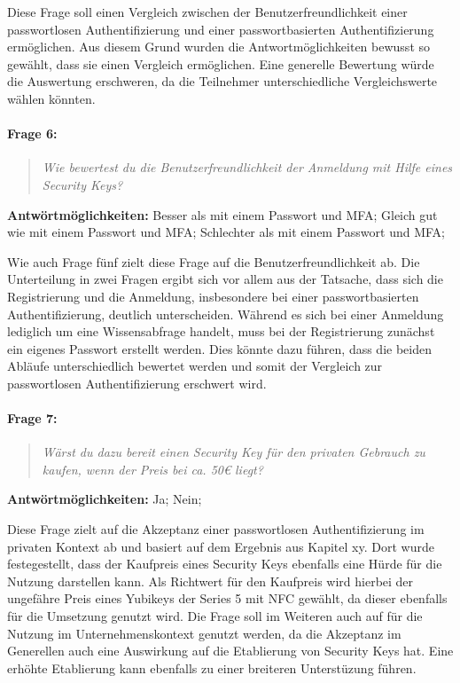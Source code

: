 Diese Frage soll einen Vergleich zwischen der Benutzerfreundlichkeit einer passwortlosen Authentifizierung und einer passwortbasierten Authentifizierung ermöglichen. Aus diesem Grund wurden die Antwortmöglichkeiten bewusst so gewählt, dass sie einen Vergleich ermöglichen. Eine generelle Bewertung würde die Auswertung erschweren, da die Teilnehmer unterschiedliche Vergleichswerte wählen könnten.

\paragraph{Frage 6:}

\begin{quote}
    \textit{Wie bewertest du die Benutzerfreundlichkeit der Anmeldung mit Hilfe eines Security Keys?}
\end{quote}

\textbf{Antwörtmöglichkeiten:} Besser als mit einem Passwort und \ac{MFA}; Gleich gut wie mit einem Passwort und \ac{MFA}; Schlechter als mit einem Passwort und \ac{MFA};

Wie auch Frage fünf zielt diese Frage auf die Benutzerfreundlichkeit ab. Die Unterteilung in zwei Fragen ergibt sich vor allem aus der Tatsache, dass sich die Registrierung und die Anmeldung, insbesondere bei einer passwortbasierten Authentifizierung, deutlich unterscheiden. Während es sich bei einer Anmeldung lediglich um eine Wissensabfrage handelt, muss bei der Registrierung zunächst ein eigenes Passwort erstellt werden. Dies könnte dazu führen, dass die beiden Abläufe unterschiedlich bewertet werden und somit der Vergleich zur passwortlosen Authentifizierung erschwert wird.

\paragraph{Frage 7:}

\begin{quote}
    \textit{Wärst du dazu bereit einen Security Key für den privaten Gebrauch zu kaufen, wenn der Preis bei ca. 50€ liegt?}
\end{quote}

\textbf{Antwörtmöglichkeiten:} Ja; Nein;

Diese Frage zielt auf die Akzeptanz einer passwortlosen Authentifizierung im privaten Kontext ab und basiert auf dem Ergebnis aus Kapitel xy. Dort wurde festegestellt, dass der Kaufpreis eines Security Keys ebenfalls eine Hürde für die Nutzung darstellen kann. Als Richtwert für den Kaufpreis wird hierbei der ungefähre Preis eines Yubikeys der Series 5 mit NFC gewählt, da dieser ebenfalls für die Umsetzung genutzt wird. Die Frage soll im Weiteren auch auf für die Nutzung im Unternehmenskontext genutzt werden, da die Akzeptanz im Generellen auch eine Auswirkung auf die Etablierung von Security Keys hat. Eine erhöhte Etablierung kann ebenfalls zu einer breiteren Unterstüzung führen.

